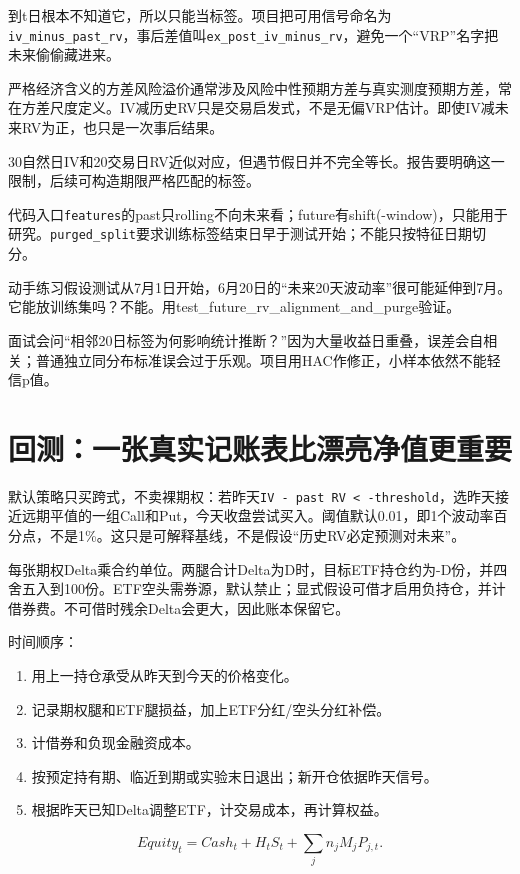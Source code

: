 \documentclass[UTF8,11pt,a4paper]{ctexart}
\begin{document}
到t日根本不知道它，所以只能当标签。项目把可用信号命名为\texttt{iv\_minus\_past\_rv}，事后差值叫\texttt{ex\_post\_iv\_minus\_rv}，避免一个“VRP”名字把未来偷偷藏进来。

严格经济含义的方差风险溢价通常涉及风险中性预期方差与真实测度预期方差，常在方差尺度定义。IV减历史RV只是交易启发式，不是无偏VRP估计。即使IV减未来RV为正，也只是一次事后结果。

30自然日IV和20交易日RV近似对应，但遇节假日并不完全等长。报告要明确这一限制，后续可构造期限严格匹配的标签。

\begin{learningbox}{代码入口}\texttt{features}的past只rolling不向未来看；future有shift(-window)，只能用于研究。\texttt{purged\_split}要求训练标签结束日早于测试开始；不能只按特征日期切分。\end{learningbox}

\begin{learningbox}{动手练习}假设测试从7月1日开始，6月20日的“未来20天波动率”很可能延伸到7月。它能放训练集吗？不能。用test\_future\_rv\_alignment\_and\_purge验证。\end{learningbox}

\begin{learningbox}{面试会问}“相邻20日标签为何影响统计推断？”因为大量收益日重叠，误差会自相关；普通独立同分布标准误会过于乐观。项目用HAC作修正，小样本依然不能轻信p值。\end{learningbox}


\section{回测：一张真实记账表比漂亮净值更重要}

默认策略只买跨式，不卖裸期权：若昨天\texttt{IV - past RV \textless{} -threshold}，选昨天接近远期平值的一组Call和Put，今天收盘尝试买入。阈值默认0.01，即1个波动率百分点，不是1\%。这只是可解释基线，不是假设“历史RV必定预测对未来”。

每张期权Delta乘合约单位。两腿合计Delta为D时，目标ETF持仓约为-D份，并四舍五入到100份。ETF空头需券源，默认禁止；显式假设可借才启用负持仓，并计借券费。不可借时残余Delta会更大，因此账本保留它。

时间顺序：

\begin{enumerate}[leftmargin=2.2em,itemsep=0.35em]
\item 用上一持仓承受从昨天到今天的价格变化。
\item 记录期权腿和ETF腿损益，加上ETF分红/空头分红补偿。
\item 计借券和负现金融资成本。
\item 按预定持有期、临近到期或实验末日退出；新开仓依据昨天信号。
\item 根据昨天已知Delta调整ETF，计交易成本，再计算权益。

\end{enumerate}
\[
Equity_t=Cash_t+H_tS_t+\sum_j n_j M_j P_{j,t}.
\]
\end{document}
